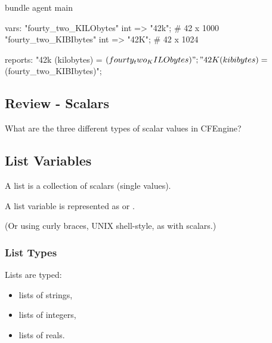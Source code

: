 \begin{codelisting}
\begin{code}
bundle agent main
{
  vars:
      "fourty_two_KILObytes" int => "42k";  # 42 x 1000
      "fourty_two_KIBIbytes" int => "42K";  # 42 x 1024

  reports:
      "42k (kilobytes) = $(fourty_two_KILObytes)";
      "42K (kibibytes) = $(fourty_two_KIBIbytes)";
}
\end{code}
\end{codelisting}
\begin{codelisting}
\end{codelisting}





\subsection{Review - Scalars}

What are the three different types of scalar values in CFEngine?





\subsection{List Variables}

A list is a collection of scalars (single values).

A list variable is represented as  or
.

(Or using curly braces, UNIX shell-style, as with scalars.)





\subsubsection{List Types}

Lists are typed:

\begin{itemize}
\item{} lists of strings,
\item{} lists of integers,
\item{} lists of reals.
\end{itemize}

